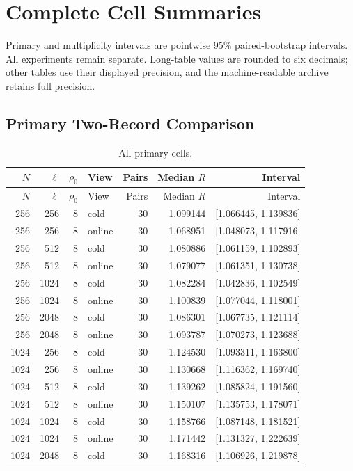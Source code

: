 \section{Complete Cell Summaries}
Primary and multiplicity intervals are pointwise 95\% paired-bootstrap intervals. All experiments remain separate. Long-table values are rounded to six decimals; other tables use their displayed precision, and the machine-readable archive retains full precision.
\subsection{Primary Two-Record Comparison}
\small\begin{longtable}{rrrlrrr}
\caption{All primary cells.}\\
\toprule $N$ & $\ell$ & $\rho_0$ & View & Pairs & Median $R$ & Interval \\ \midrule\endfirsthead
\toprule $N$ & $\ell$ & $\rho_0$ & View & Pairs & Median $R$ & Interval \\ \midrule\endhead
256 & 256 & 8 & cold & 30 & 1.099144 & [1.066445, 1.139836] \\
256 & 256 & 8 & online & 30 & 1.068951 & [1.048073, 1.117916] \\
256 & 512 & 8 & cold & 30 & 1.080886 & [1.061159, 1.102893] \\
256 & 512 & 8 & online & 30 & 1.079077 & [1.061351, 1.130738] \\
256 & 1024 & 8 & cold & 30 & 1.082284 & [1.042836, 1.102549] \\
256 & 1024 & 8 & online & 30 & 1.100839 & [1.077044, 1.118001] \\
256 & 2048 & 8 & cold & 30 & 1.086301 & [1.067735, 1.121114] \\
256 & 2048 & 8 & online & 30 & 1.093787 & [1.070273, 1.123688] \\
1024 & 256 & 8 & cold & 30 & 1.124530 & [1.093311, 1.163800] \\
1024 & 256 & 8 & online & 30 & 1.130668 & [1.116362, 1.169740] \\
1024 & 512 & 8 & cold & 30 & 1.139262 & [1.085824, 1.191560] \\
1024 & 512 & 8 & online & 30 & 1.150107 & [1.135753, 1.178071] \\
1024 & 1024 & 8 & cold & 30 & 1.158766 & [1.087148, 1.181521] \\
1024 & 1024 & 8 & online & 30 & 1.171442 & [1.131327, 1.222639] \\
1024 & 2048 & 8 & cold & 30 & 1.168316 & [1.106926, 1.219878] \\

\end{longtable}
